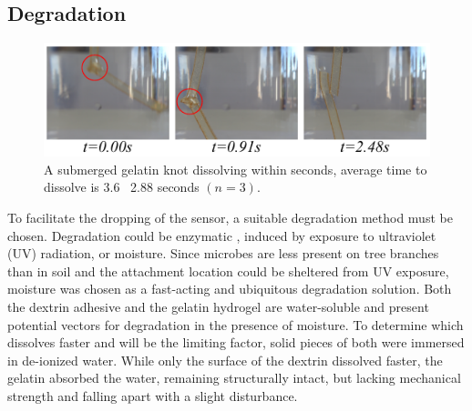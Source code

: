 \subsection{Degradation}

\begin{figure}[!t]
\centering
\includegraphics[width=1\columnwidth]{chapters/papers/BOG/figures/figure5-gelatin-degrade/figure5-gelatin-degrade.pdf}
\caption{A submerged gelatin knot dissolving within seconds, average time to dissolve is 3.6 \textpm~2.88 seconds $(n=3)$.}
\label{fig5_gelatin_degrade}
\end{figure}
To facilitate the dropping of the sensor, a suitable degradation method must be chosen. Degradation could be enzymatic \cite{Arshad2014}, induced by exposure to ultraviolet (UV) radiation, or moisture. Since microbes are less present on tree branches than in soil and the attachment location could be sheltered from UV exposure, moisture was chosen as a fast-acting and ubiquitous degradation solution.
Both the dextrin adhesive and the gelatin hydrogel are water-soluble and present potential vectors for degradation in the presence of moisture. To determine which dissolves faster and will be the limiting factor, solid pieces of both were immersed in de-ionized water. While only the surface of the dextrin dissolved faster, the gelatin absorbed the water, remaining structurally intact, but lacking mechanical strength and falling apart with a slight disturbance. 

